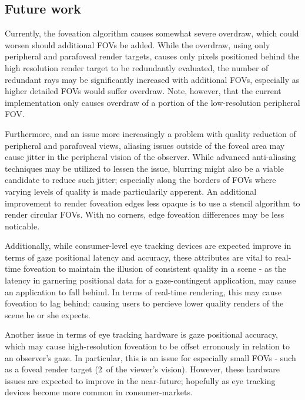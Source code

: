 \subsection{Future work}
Currently, the foveation algorithm causes somewhat severe overdraw, which could worsen should additional FOVs be added.
While the overdraw, using only peripheral and parafoveal render targets, causes only pixels positioned behind the high resolution render target to be redundantly evaluated, the number of redundant rays may be significantly increased with additional FOVs, especially as higher detailed FOVs would suffer overdraw.
Note, however, that the current implementation only causes overdraw of a portion of the low-resolution peripheral FOV.

Furthermore, and an issue more increasingly a problem with quality reduction of peripheral and parafoveal views, aliasing issues outside of the foveal area may cause jitter in the peripheral vision of the observer.
While advanced anti-aliasing techniques may be utilized to lessen the issue, blurring might also be a viable candidate to reduce such jitter; especially along the borders of FOVs where varying levels of quality is made particularily apperent.
An additional improvement to render foveation edges less opaque is to use a stencil algorithm to render circular FOVs.
With no corners, edge foveation differences may be less noticable.

Additionally, while consumer-level eye tracking devices are expected improve in terms of gaze positional latency and accuracy, these attributes are vital to real-time foveation to maintain the illusion of consistent quality in a scene - as the latency in garnering positional data for a gaze-contingent application, may cause an application to fall behind.
In terms of real-time rendering, this may cause foveation to lag behind; causing users to percieve lower quality renders of the scene he or she expects.

Another issue in terms of eye tracking hardware is gaze positional accuracy, which may cause high-resolution foveation to be offset erronously in relation to an observer's gaze.
In particular, this is an issue for especially small FOVs - such as a foveal render target ($2$\degree\ of the viewer's vision).
However, these hardware issues are expected to improve in the near-future; hopefully as eye tracking devices become more common in consumer-markets.

